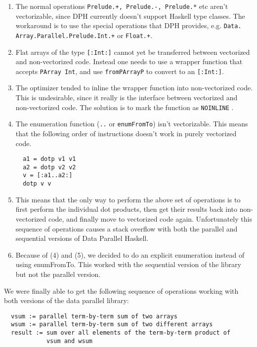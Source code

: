 \documentclass[a4paper]{acmtrans2m}
\begin{document}
\begin{enumerate}
\item The normal operations \texttt{Prelude.+, Prelude.-, Prelude.*} etc aren't vectorizable, since DPH currently doesn't support Haskell type classes. The workaround
is to use the special operations that DPH provides, e.g. \texttt{Data. Array.Parallel.Prelude.Int.+} or \texttt{Float.+}.

\item Flat arrays of the type \texttt{[:Int:]} cannot yet be transferred between
vectorized and non-vectorized code. Instead one needs to use a wrapper function
that accepts \texttt{PArray Int}, and use \texttt{fromPArrayP} to
convert to an \texttt{[:Int:]}.

\item The optimizer tended to inline the wrapper function into non-vectorized
code. This is undesirable, since it really is the interface between vectorized and
non-vectorized code. The solution is to mark the function as \texttt{NOINLINE} 
\cite{DPHRef}.

\item The enumeration function (\texttt{..} or \texttt{enumFromTo}) isn't
vectorizable. This means that the following order of instructions doesn't work in
purely vectorized code.

\begin{verbatim}
  a1 = dotp v1 v1
  a2 = dotp v2 v2
  v = [:a1..a2:]
  dotp v v
\end{verbatim}

\item This means that the only way to perform the above set of operations is to
first perform the individual dot products, then get their results back into
non-vectorized code, and finally move to vectorized code again. Unfortunately
this sequence of operations causes a stack overflow with both the parallel and
sequential versions of Data Parallel Haskell.

\item Because of (4) and (5), we decided to do an explicit enumeration instead 
of using enumFromTo. This worked with the sequential version of the library but not
the parallel version.
\end{enumerate}

We were finally able to get the following sequence of operations working with both
versions of the data parallel library:

\begin{verbatim}
  vsum := parallel term-by-term sum of two arrays
  wsum := parallel term-by-term sum of two different arrays
  result := sum over all elements of the term-by-term product of
            vsum and wsum
\end{verbatim}
\end{document}
